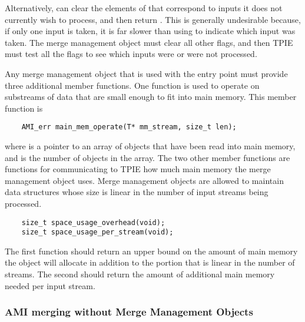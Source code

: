 Alternatively,  can clear the elements of
 that correspond to inputs it does not currently wish to
process, and then return .  This is generally
undesirable because, if only one input is taken, it is far slower than
using  to indicate which input was taken.  The merge
management object must clear all other flags, and then TPIE must test all
the flags to see which inputs were or were not processed.

Any merge management object that is used with the entry point
 must provide three additional member
functions. One function is used to operate on substreams of data that are
small enough to fit into main memory. This member function is
\begin{verbatim}
    AMI_err main_mem_operate(T* mm_stream, size_t len);
\end{verbatim}
where  is a pointer to an array of objects that have been read
into main memory, and  is the number of objects in the array. The two
other member functions are functions for communicating to TPIE how much
main memory the merge management object uses. Merge management objects are
allowed to maintain data structures whose size is linear in the number of
input streams being processed.
\begin{verbatim}
    size_t space_usage_overhead(void);
    size_t space_usage_per_stream(void);
\end{verbatim}
The first function should return an upper bound on the amount of main
memory the object will allocate in addition to the
portion that is linear in the number of streams. The second should return
the amount of additional main memory needed per input stream.




\subsubsection{AMI merging without Merge Management Objects}

